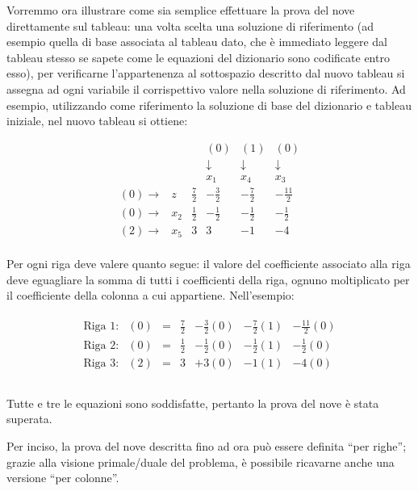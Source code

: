 \documentclass{article}
\begin{document}
  	Vorremmo ora illustrare come sia semplice effettuare la prova del nove direttamente sul tableau: una volta scelta una soluzione di riferimento (ad esempio quella di base associata al tableau dato, che \`e immediato leggere dal tableau stesso se sapete come le equazioni del dizionario sono codificate entro esso), per verificarne l'appartenenza al sottospazio descritto dal nuovo tableau si assegna ad ogni variabile il corrispettivo valore nella soluzione di riferimento. Ad esempio, utilizzando come riferimento la soluzione di base del dizionario e tableau iniziale, nel nuovo tableau si ottiene:
  	
  	\[
  	\begin{array}{rrrrrr}
  	& &  & (0)  & (1) & (0) \\
  	& &  & \downarrow \;& \downarrow \;& \downarrow \;\\
  	& &  & x_1  & x_4 & x_3  \\
  	(0) \rightarrow & z  & \frac{7}{2} & -\frac{3}{2} & -\frac{7}{2}  & -\frac{11}{2} \\  	
  	(0) \rightarrow & x_2 &  \frac{1}{2} &  -\frac{1}{2}  & -\frac{1}{2}  &  -\frac{1}{2} \\
  	(2) \rightarrow &   x_5 &  3 &  3  &  -1  &  -4 \\
  	\end{array}
  	\]
  	
  	Per ogni riga deve valere quanto segue: il valore del coefficiente associato alla riga deve eguagliare la somma di tutti i coefficienti della riga, ognuno moltiplicato per il coefficiente della colonna a cui appartiene. Nell'esempio:
  	
	\[
	\begin{array}{c}
	\begin{array}{llcrrrr}
	\text{Riga 1:} & (0) &=& \frac{7}{2}  & -\frac{3}{2}(0) & -\frac{7}{2}(1) & -\frac{11}{2}(0) \\
	\text{Riga 2:} & (0) &=& \frac{1}{2} & -\frac{1}{2}(0) & -\frac{1}{2}(1) & -\frac{1}{2}(0) \\
	\text{Riga 3:} & (2) &=& 3 & +3(0) & -1(1) & -4(0) \\
	\end{array}\\		
	\end{array}
	\]  	
	
  	Tutte e tre le equazioni sono soddisfatte, pertanto la prova del nove è stata superata.
  	
  	Per inciso, la prova del nove descritta fino ad ora può essere definita ``per righe''; grazie alla visione primale/duale del problema, è possibile ricavarne anche una versione ``per colonne''.
  	
\end{document}
